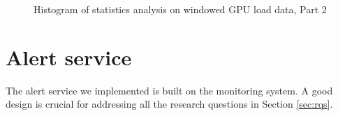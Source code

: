 \begin{figure}[H]
    \centering
        \\
        \\
        \\
    \caption{Histogram of statistics analysis on windowed GPU load data, Part 2}
    \label{fig_load_gpu_histogram_2}
\end{figure}

\section{Alert service}
\label{sec:alertservice}
The alert service we implemented is built on the monitoring system. A good design is crucial for addressing all the research questions in Section \ref{sec:rqs}.


